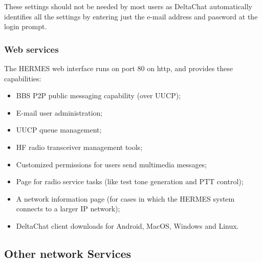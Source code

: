 These settings should not be needed by most users as DeltaChat automatically identifies all the settings by entering just the e-mail address and password at the login prompt.

\subsubsection{Web services}
\label{apx_net_web}

The HERMES web interface runs on port 80 on http, and provides these capabilities:
\begin{itemize}
    \item BBS P2P public messaging capability (over UUCP);
    \item E-mail user administration;
    \item UUCP queue management;
    \item HF radio transceiver management tools;
    \item Customized permissions for users send multimedia messages;
    \item Page for radio service tasks (like test tone generation and PTT control);
    \item A network information page (for cases in which the HERMES system connects to a larger IP network);
    \item DeltaChat client downloads for Android, MacOS, Windows and Linux.
\end{itemize}

\subsection{Other network Services }
\label{apx_other_net}


